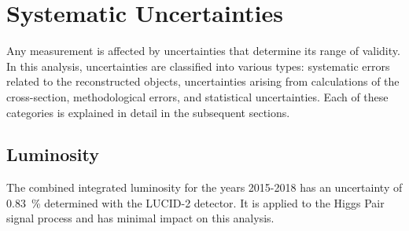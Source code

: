 \chapter{Systematic Uncertainties}\label{ch:systematics}
Any measurement is affected by uncertainties that determine its range of validity. In this analysis, uncertainties are classified into various types: systematic errors related to the reconstructed objects, uncertainties arising from calculations of the cross-section, methodological errors, and statistical uncertainties. Each of these categories is explained in detail in the subsequent sections.

\section{Luminosity}
The combined integrated luminosity for the years 2015-2018 has an uncertainty of \qty[]{0.83}{\percent} determined with the LUCID-2 detector. It is applied to the Higgs Pair signal process and has minimal impact on this analysis.

